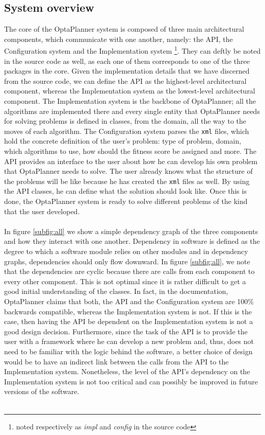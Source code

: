 \subsection{System overview}
The core of the OptaPlanner system is composed of three main architectural components, which communicate with one another, namely: the API, the Configuration system and the Implementation system \footnote{noted respectively as \textit{impl} and \textit{config} in the source code}. They can deftly be noted in the source code as well, as each one of them corresponds to one of the three packages in the core. Given the implementation details that we have discerned from the source code, we can define the API as the highest-level architectural component, whereas the Implementation system as the lowest-level architectural component. The Implementation system is the backbone of OptaPlanner; all the algorithms are implemented there and every single entity that OptaPlanner needs for solving problems is defined in classes, from the domain, all the way to the moves of each algorithm. The Configuration system parses the \verb!xml! files, which hold the concrete definition of the user’s problem: type of problem, domain, which algorithms to use, how should the fitness score be assigned and more. The API provides an interface to the user about how he can develop his own problem that OptaPlanner needs to solve. The user already knows what the structure of the problems will be like because he has created the \verb!xml! files as well. By using the API classes, he can define what the solution should look like. Once this is done, the OptaPlanner system is ready to solve different problems of the kind that the user developed. \\\\
In figure \ref{subfig:all} we show a simple dependency graph of the three components and how they interact with one another. Dependency in software is defined as the degree to which a software module relies on other modules and in dependency graphs, dependencies should only flow downward. In figure \ref{subfig:all}, we note that the dependencies are cyclic because there are calls from each component to every other component. This is not optimal since it is rather difficult to get a good initial understanding of the classes. In fact, in the documentation, OptaPlanner claims that both, the API and the Configuration system are 100\% backwards compatible, whereas the Implementation system is not. If this is the case, then having the API be dependent on the Implementation system is not a good design decision. Furthermore, since the task of the API is to provide the user with a framework where he can develop a new problem and, thus, does not need to be familiar with the logic behind the software, a better choice of design would be to have an indirect link between the calls from the API to the Implementation system. Nonetheless, the level of the API’s dependency on the Implementation system is not too critical and can possibly be improved in future versions of the software.\\\\
